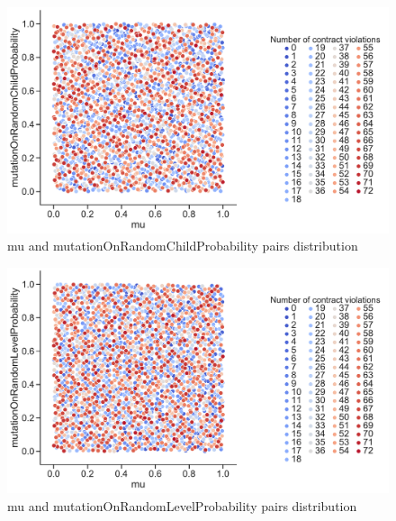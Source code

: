 \begin{figure}
	\centering
	\includegraphics[width=\textwidth]{images/PairsDistr/mu_mutationOnRandomChildProbability.pdf}
	\caption[mu and mutationOnRandomChildProbability pairs distribution]{mu and mutationOnRandomChildProbability pairs distribution}
	\label{fig:mu_mutationOnRandomChildProbability_pair}
\end{figure}
\clearpage
\begin{figure}
	\centering
	\includegraphics[width=\textwidth]{images/PairsDistr/mu_mutationOnRandomLevelProbability.pdf}
	\caption[mu and mutationOnRandomLevelProbability pairs distribution]{mu and mutationOnRandomLevelProbability pairs distribution}
	\label{fig:mu_mutationOnRandomLevelProbability_pair}
\end{figure}
\clearpage
